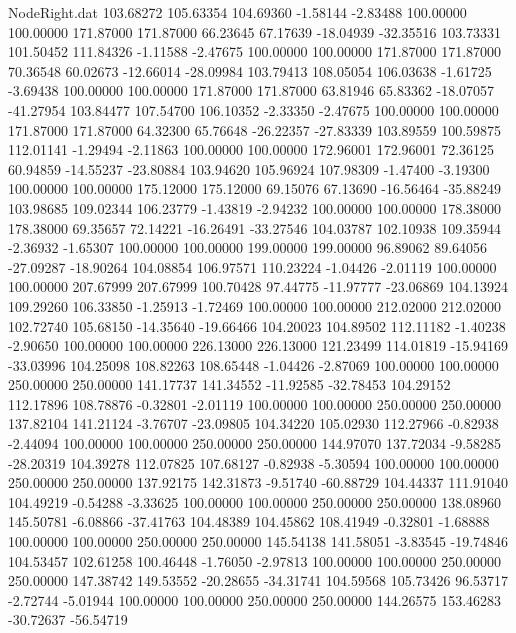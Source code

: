 \begin{filecontents}{NodeRight.dat}
 103.68272  105.63354  104.69360    -1.58144   -2.83488  100.00000  100.00000  171.87000  171.87000   66.23645   67.17639  -18.04939  -32.35516
 103.73331  101.50452  111.84326    -1.11588   -2.47675  100.00000  100.00000  171.87000  171.87000   70.36548   60.02673  -12.66014  -28.09984
 103.79413  108.05054  106.03638    -1.61725   -3.69438  100.00000  100.00000  171.87000  171.87000   63.81946   65.83362  -18.07057  -41.27954
 103.84477  107.54700  106.10352    -2.33350   -2.47675  100.00000  100.00000  171.87000  171.87000   64.32300   65.76648  -26.22357  -27.83339
 103.89559  100.59875  112.01141    -1.29494   -2.11863  100.00000  100.00000  172.96001  172.96001   72.36125   60.94859  -14.55237  -23.80884
 103.94620  105.96924  107.98309    -1.47400   -3.19300  100.00000  100.00000  175.12000  175.12000   69.15076   67.13690  -16.56464  -35.88249
 103.98685  109.02344  106.23779    -1.43819   -2.94232  100.00000  100.00000  178.38000  178.38000   69.35657   72.14221  -16.26491  -33.27546
 104.03787  102.10938  109.35944    -2.36932   -1.65307  100.00000  100.00000  199.00000  199.00000   96.89062   89.64056  -27.09287  -18.90264
 104.08854  106.97571  110.23224    -1.04426   -2.01119  100.00000  100.00000  207.67999  207.67999  100.70428   97.44775  -11.97777  -23.06869
 104.13924  109.29260  106.33850    -1.25913   -1.72469  100.00000  100.00000  212.02000  212.02000  102.72740  105.68150  -14.35640  -19.66466
 104.20023  104.89502  112.11182    -1.40238   -2.90650  100.00000  100.00000  226.13000  226.13000  121.23499  114.01819  -15.94169  -33.03996
 104.25098  108.82263  108.65448    -1.04426   -2.87069  100.00000  100.00000  250.00000  250.00000  141.17737  141.34552  -11.92585  -32.78453
 104.29152  112.17896  108.78876    -0.32801   -2.01119  100.00000  100.00000  250.00000  250.00000  137.82104  141.21124   -3.76707  -23.09805
 104.34220  105.02930  112.27966    -0.82938   -2.44094  100.00000  100.00000  250.00000  250.00000  144.97070  137.72034   -9.58285  -28.20319
 104.39278  112.07825  107.68127    -0.82938   -5.30594  100.00000  100.00000  250.00000  250.00000  137.92175  142.31873   -9.51740  -60.88729
 104.44337  111.91040  104.49219    -0.54288   -3.33625  100.00000  100.00000  250.00000  250.00000  138.08960  145.50781   -6.08866  -37.41763
 104.48389  104.45862  108.41949    -0.32801   -1.68888  100.00000  100.00000  250.00000  250.00000  145.54138  141.58051   -3.83545  -19.74846
 104.53457  102.61258  100.46448    -1.76050   -2.97813  100.00000  100.00000  250.00000  250.00000  147.38742  149.53552  -20.28655  -34.31741
 104.59568  105.73426   96.53717    -2.72744   -5.01944  100.00000  100.00000  250.00000  250.00000  144.26575  153.46283  -30.72637  -56.54719

\end{filecontents}
